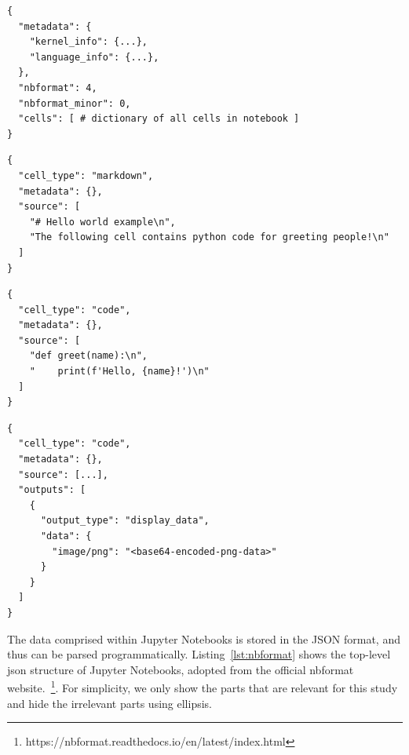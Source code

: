 \documentclass[acmsmall,screen,review,anonymous]{acmart}
\begin{document}
\begin{minipage}{0.45\textwidth}
  \begin{lstlisting}
{
  "metadata": {
    "kernel_info": {...},
    "language_info": {...},
  },
  "nbformat": 4,
  "nbformat_minor": 0,
  "cells": [ # dictionary of all cells in notebook ]
}
  \end{lstlisting}
  \label{lst:nbformat}
\end{minipage}
\hfill
\begin{minipage}{0.45\textwidth}
  \begin{lstlisting}
{
  "cell_type": "markdown",
  "metadata": {},
  "source": [
    "# Hello world example\n",
    "The following cell contains python code for greeting people!\n"
  ]
}
  \end{lstlisting}
  \label{lst:cell-md}
\end{minipage}
\begin{minipage}{0.45\textwidth}
  \begin{lstlisting}
{
  "cell_type": "code",
  "metadata": {},
  "source": [
    "def greet(name):\n",
    "    print(f'Hello, {name}!')\n"
  ]
}
  \end{lstlisting}
  \label{lst:cell-code}
\end{minipage}
\hfill
\begin{minipage}{0.45\textwidth}
  \begin{lstlisting}
{
  "cell_type": "code",
  "metadata": {},
  "source": [...],
  "outputs": [
    {
      "output_type": "display_data",
      "data": {
        "image/png": "<base64-encoded-png-data>"
      }
    }
  ]
}
  \end{lstlisting}
  \label{lst:cell-output}
\end{minipage}

The data comprised within Jupyter Notebooks is stored in the JSON format, and thus can be parsed programmatically. Listing~\ref{lst:nbformat} shows the top-level json structure of Jupyter Notebooks, adopted from the official nbformat website.~\footnote{https://nbformat.readthedocs.io/en/latest/index.html}. For simplicity, we only show the parts that are relevant for this study and hide the irrelevant parts using ellipsis.
\end{document}
